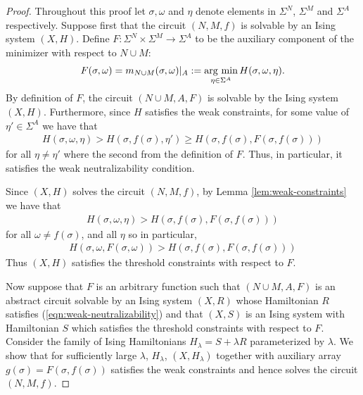 \documentclass{article}
\begin{document}
\begin{proof}
  Throughout this proof let $\sigma, \omega$ and $\eta$ denote elements in $\Sigma^N$, $\Sigma^M$ and $\Sigma^A$ respectively. Suppose first that the circuit $(N, M, f)$ is solvable by an Ising system $(X, H)$. Define $F:\Sigma^N\times \Sigma^M \to \Sigma^A$ to be the auxiliary component of the minimizer with respect to $N\cup M$:
  \begin{align*}
    F(\sigma, \omega) = m_{N\cup M}(\sigma, \omega)|_A := \operatorname*{arg ~ min}_{\eta\in \Sigma^A} H(\sigma, \omega, \eta).
  \end{align*}
  By definition of $F$, the circuit $(N\cup M, A, F)$ is solvable by the Ising system $(X, H)$. Furthermore, since $H$ satisfies the weak constraints, for some value of $\eta' \in \Sigma^A$ we have that
  \begin{align*}
    H(\sigma, \omega, \eta) > H(\sigma, f(\sigma), \eta') \geq H(\sigma, f(\sigma), F(\sigma, f(\sigma)))
  \end{align*}
  for all $\eta \neq \eta'$ where the second from the definition of $F$. Thus, in particular, it satisfies the weak neutralizability condition.

  Since $(X,H)$ solves the circuit $(N, M, f)$, by Lemma \ref{lem:weak-constraints} we have that
  \begin{align*}
    H(\sigma, \omega, \eta) > H(\sigma, f(\sigma), F(\sigma, f(\sigma)))
  \end{align*}
  for all $\omega \neq f(\sigma)$, and all $\eta$ so in particular,
  \begin{align*}
    H(\sigma, \omega, F(\sigma, \omega)) > H(\sigma, f(\sigma), F(\sigma, f(\sigma)))
  \end{align*}
  Thus $(X, H)$ satisfies the threshold constraints with respect to $F$.

  \vspace{1.5em}

  Now suppose that $F$ is an arbitrary function such that $(N\cup M, A, F)$ is an abstract circuit solvable by an Ising system $(X, R)$ whose Hamiltonian $R$ satisfies (\ref{eqn:weak-neutralizability}) and that $(X,S)$ is an Ising system with Hamiltonian $S$ which satisfies the threshold constraints with respect to $F$. Consider the family of Ising Hamiltonians $H_\lambda = S + \lambda R$ parameterized by $\lambda$. We show that for sufficiently large $\lambda$, $H_\lambda$, $(X,H_\lambda)$ together with auxiliary array $g(\sigma) = F(\sigma, f(\sigma))$ satisfies the weak constraints and hence solves the circuit $(N,M,f)$.


\end{proof}
\end{document}

